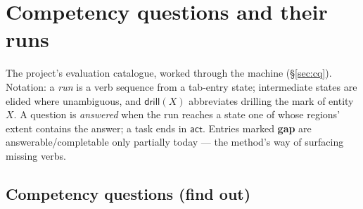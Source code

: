 \documentclass[11pt,a4paper]{article}
\theoremstyle{remark}
\newcommand{\vdrill}{\mathsf{drill}}
\newcommand{\vact}{\mathsf{act}}
\begin{document}
\cleardoublepage
\section{Competency questions and their runs}\label{app:cq}

The project's evaluation catalogue, worked through the machine
(\S\ref{sec:cq}). Notation: a \emph{run} is a verb sequence from a tab-entry
state; intermediate states are elided where unambiguous, and
$\vdrill(X)$ abbreviates drilling the mark of entity $X$. A question is
\emph{answered} when the run reaches a state one of whose regions' extent
contains the answer; a task ends in $\vact$. Entries marked \textbf{gap} are
answerable/completable only partially today --- the method's way of surfacing
missing verbs.

\subsection{Competency questions (find out)}
\end{document}
